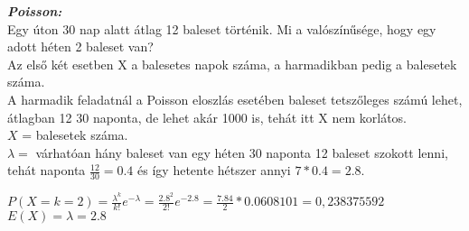 \documentclass[tikz,12pt,margin=0px]{article}
\newcommand\ddfrac[2]{\frac{\displaystyle #1}{\displaystyle #2}}
\begin{document}
    \noindent \textbf{\emph{Poisson:}}\\
    Egy úton 30 nap alatt átlag 12 baleset történik. Mi a valószínűsége, hogy egy adott héten 2 baleset van?\\
    Az első két esetben X a balesetes napok száma, a harmadikban pedig a balesetek száma.\\
    
    \noindent A harmadik feladatnál a Poisson eloszlás esetében baleset tetszőleges számú lehet, átlagban 12 30 naponta, de lehet akár 1000 is, tehát itt X nem korlátos.\\
    $X$ = balesetek száma.\\
    $\lambda =$ várhatóan hány baleset van egy héten 30 naponta 12 baleset szokott lenni, tehát naponta $\ddfrac{12}{30} = 0.4$ és így hetente hétszer annyi $7 * 0.4 = 2.8$.\\
    \begin{center}
        $P(X = k = 2) = \ddfrac{\lambda^k}{k!}e^{-\lambda} = \ddfrac{2.8^2}{2!}e^{-2.8} = \ddfrac{7.84}{2} * 0.0608101 = 0,238375592$\\
        $E(X) = \lambda = 2.8$\\
    \end{center}
\end{document}
